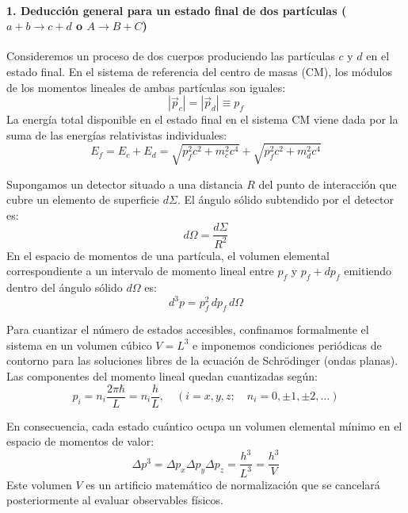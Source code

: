 \paragraph{1. Deducción general para un estado final de dos partículas ($a + b \to c + d$ o $A \to B + C$)}

Consideremos un proceso de dos cuerpos produciendo las partículas $c$ y $d$ en el estado final. En el sistema de referencia del centro de masas (CM), los módulos de los momentos lineales de ambas partículas son iguales:
\begin{equation}
|\vec{p}_c| = |\vec{p}_d| \equiv p_f
\end{equation}
La energía total disponible en el estado final en el sistema CM viene dada por la suma de las energías relativistas individuales:
\begin{equation}
E_f = E_c + E_d = \sqrt{p_f^2 c^2 + m_c^2 c^4} + \sqrt{p_f^2 c^2 + m_d^2 c^4}
\end{equation}

Supongamos un detector situado a una distancia $R$ del punto de interacción que cubre un elemento de superficie $d\Sigma$. El ángulo sólido subtendido por el detector es:
\begin{equation}
d\Omega = \frac{d\Sigma}{R^2}
\end{equation}
En el espacio de momentos de una partícula, el volumen elemental correspondiente a un intervalo de momento lineal entre $p_f$ y $p_f + dp_f$ emitiendo dentro del ángulo sólido $d\Omega$ es:
\begin{equation}
d^3p = p_f^2 \, dp_f \, d\Omega
\end{equation}

Para cuantizar el número de estados accesibles, confinamos formalmente el sistema en un volumen cúbico $V = L^3$ e imponemos condiciones periódicas de contorno para las soluciones libres de la ecuación de Schrödinger (ondas planas). Las componentes del momento lineal quedan cuantizadas según:
\begin{equation}
p_i = n_i \frac{2\pi\hbar}{L} = n_i \frac{h}{L}, \quad (i = x, y, z; \quad n_i = 0, \pm 1, \pm 2, \dots)
\end{equation}

En consecuencia, cada estado cuántico ocupa un volumen elemental mínimo en el espacio de momentos de valor:
\begin{equation}
\Delta p^3 = \Delta p_x \Delta p_y \Delta p_z = \frac{h^3}{L^3} = \frac{h^3}{V}
\end{equation}
Este volumen $V$ es un artificio matemático de normalización que se cancelará posteriormente al evaluar observables físicos.

